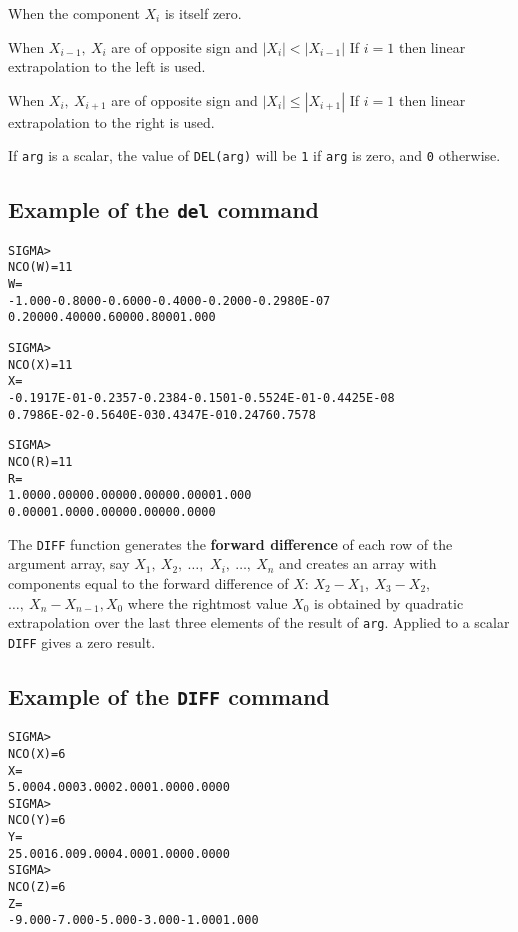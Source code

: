 \begin{OL}
\item When the component \( X_i \) is itself zero.
\item When \( X_{i-1}, \:X_i \) are of opposite sign and 
      \( \left| X_i \right| < \left| X_{i-1} \right| \)
      If \( i = 1 \) then linear extrapolation to the left is used.
\item When \( X_i, \:X_{i+1} \) are of opposite sign and 
      \( \left| X_i \right| \leq \left| X_{i+1} \right| \)
      If \( i = 1 \) then linear extrapolation to the right is used.
\end{OL}

If \texttt{arg} is a scalar, the value of \texttt{DEL(arg)} will be \texttt{1}
if \texttt{arg} is zero, and \texttt{0} otherwise.

\subsection*{Example of the \texttt{del} command}
\begin{alltt}
  SIGMA > 
  NCO(W       )=   11
  W       =
   -1.000    -0.8000    -0.6000    -0.4000    -0.2000    -0.2980E-07
   0.2000     0.4000     0.6000     0.8000      1.000
 
  SIGMA > 
  NCO(X       )=   11
  X       =
  -0.1917E-01 -0.2357    -0.2384    -0.1501    -0.5524E-01-0.4425E-08
   0.7986E-02 -0.5640E-03 0.4347E-01 0.2476     0.7578
 
  SIGMA > 
  NCO(R       )=   11
  R       =
    1.000     0.0000     0.0000     0.0000     0.0000      1.000
   0.0000      1.000     0.0000     0.0000     0.0000
\end{alltt}

 
The \texttt{DIFF} function generates the {\bf forward difference}
of each row of the argument array, say 
\(X_1,\:X_2,\:\ldots,\) 
\(X_i,\:\ldots,\:X_n\)
and creates an array with components equal to the forward difference of 
\(X\): \(X_2-X_1,\:X_3-X_2,\)
\(\ldots,\:X_n-X_{n-1},X_0\)
where the rightmost value \(X_0\) 
is obtained by quadratic extrapolation over the last
three elements of the result of \texttt{arg}. 
Applied to a scalar \texttt{DIFF} gives a zero result.

\subsection*{Example of the \texttt{DIFF} command}
\begin{alltt}
  SIGMA > 
  NCO(X       )=    6
  X       =
    5.000      4.000      3.000      2.000      1.000     0.0000
  SIGMA > 
  NCO(Y       )=    6
  Y       =
    25.00      16.00      9.000      4.000      1.000     0.0000
  SIGMA > 
  NCO(Z       )=    6
  Z       =
   -9.000     -7.000     -5.000     -3.000     -1.000      1.000
\end{alltt}

